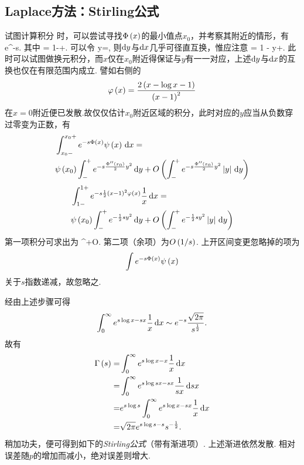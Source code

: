 \documentclass[UTF-8]{ctexart}
\begin{document}
  \subsection{Laplace方法：Stirling公式}
  试图计算积分
  {}
  时，可以尝试寻找$\Phi\left(x\right)$的最小值点$x_0$，并考察其附近的情形，有
  {e^{-s}.}
  其中
  {\varphi{} = 1-+\cdots.}
  可以令
  {y=,}
  则$\mathrm{d} y$与$\mathrm{d} x$几乎可径直互换，惟应注意
  {\frac{\dy}{\dx} = 1 - y+\cdots.}
  此时可以试图做换元积分，而$x$仅在$x_0$附近得保证与$y$有一一对应，上述$\mathrm{d} y$与$\mathrm{d} x$的互换也仅在有限范围内成立. 譬如右侧的
  \[ \varphi\left(x\right) = \frac{2\left(x-\log x -1\right)}{\left(x-1\right)^2} \]
  在$x=0$附近便已发散.故仅仅估计$x_0$附近区域的积分，此时对应的$y$应当从负数穿过零变为正数，有
  \begin{align*}
  &\int_{x_0-}^{x_0 +} e^{-s\Phi\left(x\right)}\psi\left(x\right) \, \mathrm{d} x = \\ & \psi\left(x_0\right)\int_{-}^{+} e^{-s\frac{\Phi''\left(x_0\right)}{2}y^2} \, \mathrm{d} y + O\left(\int_{-}^{+} e^{-s\frac{\Phi''\left(x_0\right)}{2}y^2}\left\vert y\right\vert \, \mathrm{d} y\right)
  \end{align*}
  \hrulefill
  \begin{align*}
  &\int_{1-}^{1+} e^{-s\frac{1}{2}\left(x-1\right)^2\varphi\left(x\right)}\frac{1}{x} \, \mathrm{d} x = \\& \psi\left(x_0\right)\int_{-}^{+} e^{-\frac{1}{2} sy^2} \, \mathrm{d} y + O\left(\int_{-}^{+} e^{-\frac{1}{2} sy^2}\left\vert y\right\vert \, \mathrm{d} y\right)
  \end{align*}
  第一项积分可求出为
  {^{\half}+O.}
  第二项（余项）为$O\left(1/s\right)$. 上开区间变更忽略掉的项为
  \[ \int e^{-s\Phi\left(x\right)}\psi\left(x\right) \]
  关于$s$指数递减，故忽略之.
  \par
  经由上述步骤可得
  \[ \int_0^\infty e^{s\log x - sx}\frac{1}{x} \, \mathrm{d} x \sim e^{-s}\frac{\sqrt{2\pi}}{s^{\frac{1}{2}}}. \]
  故有
  \begin{align*}
  \Gamma\left(s\right) =& \int_0^\infty e^{s\log x - x}\frac{1}{x} \, \mathrm{d} x\\ =& \int_0^\infty e^{s\log sx - sx}\frac{1}{sx} \, \mathrm{d} sx \\=& e^{s\log s}\int_0^\infty e^{s\log x - sx}\frac{1}{x} \, \mathrm{d} x\\
  =& \sqrt{2\pi} e^{s\log s-s}s^{-\frac{1}{2}}.
  \end{align*}
  稍加功夫，便可得到如下的\emph{Stirling公式}（带有渐进项）.
  上述渐进依然发散. 相对误差随$p$的增加而减小，绝对误差则增大.
\end{document}
